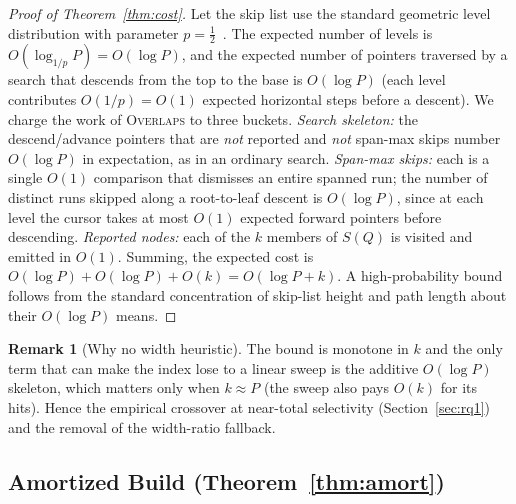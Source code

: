 \documentclass[10pt]{article}
\theoremstyle{definition}
\newtheorem{remark}{Remark}
\begin{document}
\begin{proof}[Proof of Theorem~\ref{thm:cost}]
Let the skip list use the standard geometric level distribution with parameter
$p=\tfrac12$~\citep{pugh1990skiplists}. The expected number of levels is
$O(\log_{1/p} P)=O(\log P)$, and the expected number of pointers traversed by a search
that descends from the top to the base is $O(\log P)$ (each level contributes $O(1/p)=O(1)$
expected horizontal steps before a descent). We charge the work of \textsc{Overlaps} to
three buckets. \emph{Search skeleton:} the descend/advance pointers that are \emph{not}
reported and \emph{not} span-max skips number $O(\log P)$ in expectation, as in an
ordinary search. \emph{Span-max skips:} each is a single $O(1)$ comparison that dismisses
an entire spanned run; the number of distinct runs skipped along a root-to-leaf descent is
$O(\log P)$, since at each level the cursor takes at most $O(1)$ expected forward pointers
before descending. \emph{Reported nodes:} each of the $k$ members of $S(Q)$ is visited and
emitted in $O(1)$. Summing, the expected cost is $O(\log P)+O(\log P)+O(k)=O(\log P + k)$.
A high-probability bound follows from the standard concentration of skip-list height and
path length about their $O(\log P)$ means.
\end{proof}

\begin{remark}[Why no width heuristic]
The bound is monotone in $k$ and the only term that can make the index lose to a linear
sweep is the additive $O(\log P)$ skeleton, which matters only when $k\approx P$ (the
sweep also pays $O(k)$ for its hits). Hence the empirical crossover at near-total
selectivity (Section~\ref{sec:rq1}) and the removal of the width-ratio fallback.
\end{remark}

\subsection{Amortized Build (Theorem~\ref{thm:amort})}
\end{document}
